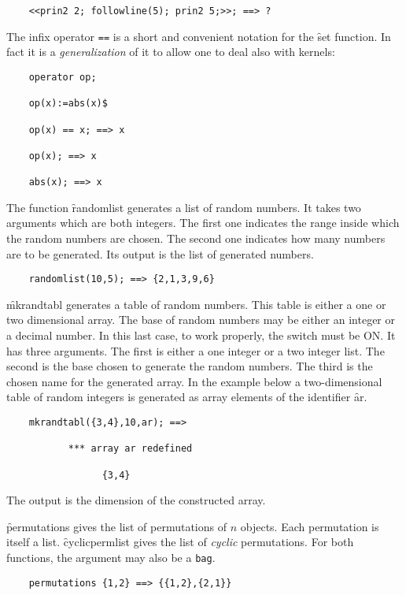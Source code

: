 \begin{itemize}
\begin{verbatim}
    <<prin2 2; followline(5); prin2 5;>>; ==> ?
\end{verbatim}
\hypertarget{reserved:setvalueop}{}
The infix operator \texttt{==} is a short and convenient notation for the \f{set}
function. In fact it is a \emph{generalization} of it to allow one to
deal also with kernels:
\begin{verbatim}
    operator op;

    op(x):=abs(x)$

    op(x) == x; ==> x

    op(x); ==> x
        
    abs(x); ==> x
\end{verbatim}
\hypertarget{operator:RANDOMLIST}{}
The function \f{randomlist} generates a list of random numbers. It takes
two arguments which are both integers. The first one indicates the range
inside which the random numbers are chosen. The second one indicates how
many numbers are to be generated. Its output is the list of 
generated numbers.
\begin{verbatim}
    randomlist(10,5); ==> {2,1,3,9,6}
\end{verbatim}
\hypertarget{operator:MKRANDTABL}{}
\f{mkrandtabl} generates a table of random numbers. This table is either
a one or two dimensional array. The base of random numbers may be either
an integer or a decimal number. In this last case, to work properly,
the switch  must be ON. It has three arguments. The first is
either a one integer or a two integer list. The second is the base chosen
to generate the random numbers. The third is the chosen name for the
generated array. In the example below a two-dimensional table of
random integers is generated as array elements of the identifier {\f ar}.
\begin{verbatim}
    mkrandtabl({3,4},10,ar); ==>

           *** array ar redefined

                 {3,4}
\end{verbatim}
The output is the dimension of the constructed array.

\hypertarget{operator:PERMUTATIONS}{}
\hypertarget{operator:CYCLICPERMLIST}{}
\f{permutations} gives the list of permutations of $n$ objects.
Each permutation is itself a list. \f{cyclicpermlist} gives the list of
\emph{cyclic} permutations. For both functions, the argument may
also be a {\tt bag}.
\begin{verbatim}
    permutations {1,2} ==> {{1,2},{2,1}}


\end{verbatim}
\end{itemize}
